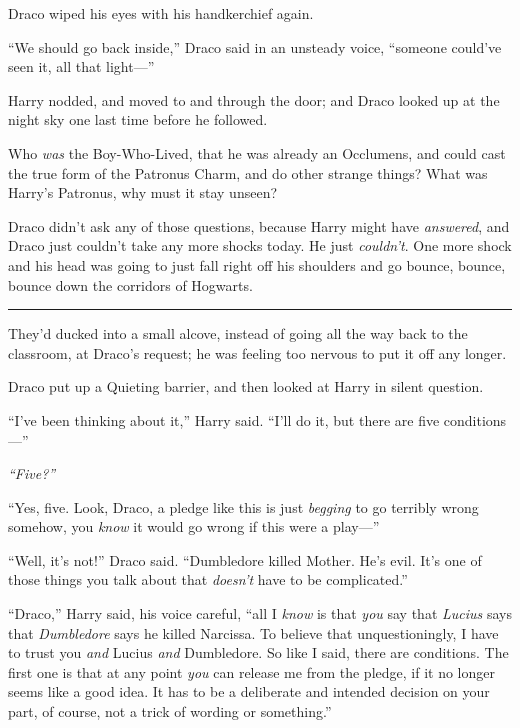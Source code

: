 Draco wiped his eyes with his handkerchief again.

``We should go back inside,'' Draco said in an unsteady voice, ``someone
could've seen it, all that light---''

Harry nodded, and moved to and through the door; and Draco looked up at
the night sky one last time before he followed.

Who \emph{was} the Boy-Who-Lived, that he was already an Occlumens, and
could cast the true form of the Patronus Charm, and do other strange
things? What was Harry's Patronus, why must it stay unseen?

Draco didn't ask any of those questions, because Harry might have
\emph{answered}, and Draco just couldn't take any more shocks today. He
just \emph{couldn't}. One more shock and his head was going to just fall
right off his shoulders and go bounce, bounce, bounce down the corridors
of Hogwarts.

\begin{center}\rule{3in}{0.4pt}\end{center}

They'd ducked into a small alcove, instead of going all the way back to
the classroom, at Draco's request; he was feeling too nervous to put it
off any longer.

Draco put up a Quieting barrier, and then looked at Harry in silent
question.

``I've been thinking about it,'' Harry said. ``I'll do it, but there are
five conditions---''

\emph{``Five?''}

``Yes, five. Look, Draco, a pledge like this is just \emph{begging} to
go terribly wrong somehow, you \emph{know} it would go wrong if this
were a play---''

``Well, it's not!'' Draco said. ``Dumbledore killed Mother. He's evil.
It's one of those things you talk about that \emph{doesn't} have to be
complicated.''

``Draco,'' Harry said, his voice careful, ``all I \emph{know} is that
\emph{you} say that \emph{Lucius} says that \emph{Dumbledore} says he
killed Narcissa. To believe that unquestioningly, I have to trust you
\emph{and} Lucius \emph{and} Dumbledore. So like I said, there are
conditions. The first one is that at any point \emph{you} can release me
from the pledge, if it no longer seems like a good idea. It has to be a
deliberate and intended decision on your part, of course, not a trick of
wording or something.''

